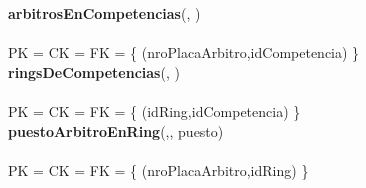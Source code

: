 \noindent\textbf{arbitrosEnCompetencias}(, )
\\
\\
PK = CK = FK = \{ (nroPlacaArbitro,idCompetencia) \} \\

\noindent\textbf{ringsDeCompetencias}(, )
\\
\\
PK = CK = FK = \{ (idRing,idCompetencia) \} \\

\noindent\textbf{puestoArbitroEnRing}(,, puesto)
\\
\\
PK = CK = FK = \{ (nroPlacaArbitro,idRing) \} \\

